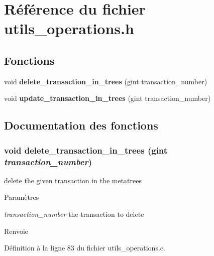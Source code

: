 \section{Référence du fichier utils\_\-operations.h}
\label{utils__operations_8h}
\subsection*{Fonctions}
\begin{DoxyCompactItemize}
\item 
void {\bf delete\_\-transaction\_\-in\_\-trees} (gint transaction\_\-number)
\item 
void {\bf update\_\-transaction\_\-in\_\-trees} (gint transaction\_\-number)
\end{DoxyCompactItemize}


\subsection{Documentation des fonctions}
\subsubsection[{delete\_\-transaction\_\-in\_\-trees}]{\setlength{\rightskip}{0pt plus 5cm}void delete\_\-transaction\_\-in\_\-trees (gint {\em transaction\_\-number})}\label{utils__operations_8h_a3e5da28eed95cd789a2b084e60463ac8}
delete the given transaction in the metatrees


\begin{DoxyParams}{Paramètres}
\item[{\em transaction\_\-number}]the transaction to delete\end{DoxyParams}
\begin{DoxyReturn}{Renvoie}

\end{DoxyReturn}


Définition à la ligne 83 du fichier utils\_\-operations.c.

